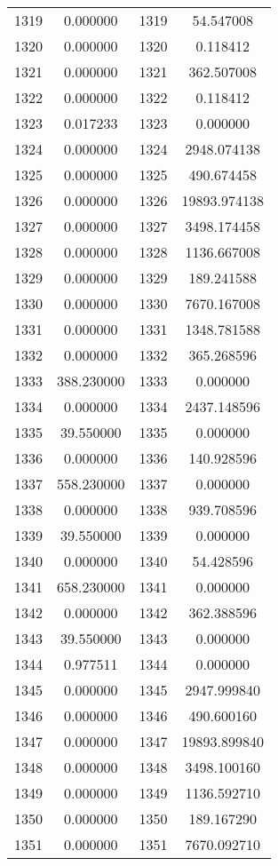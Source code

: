 \documentclass[12pt]{article}
\begin{document}
\begin{longtable}{@{}cccc@{}}
1319 & 0.000000 & 1319 & 54.547008 \\
1320 & 0.000000 & 1320 & 0.118412 \\
1321 & 0.000000 & 1321 & 362.507008 \\
1322 & 0.000000 & 1322 & 0.118412 \\
1323 & 0.017233 & 1323 & 0.000000 \\
1324 & 0.000000 & 1324 & 2948.074138 \\
1325 & 0.000000 & 1325 & 490.674458 \\
1326 & 0.000000 & 1326 & 19893.974138 \\
1327 & 0.000000 & 1327 & 3498.174458 \\
1328 & 0.000000 & 1328 & 1136.667008 \\
1329 & 0.000000 & 1329 & 189.241588 \\
1330 & 0.000000 & 1330 & 7670.167008 \\
1331 & 0.000000 & 1331 & 1348.781588 \\
1332 & 0.000000 & 1332 & 365.268596 \\
1333 & 388.230000 & 1333 & 0.000000 \\
1334 & 0.000000 & 1334 & 2437.148596 \\
1335 & 39.550000 & 1335 & 0.000000 \\
1336 & 0.000000 & 1336 & 140.928596 \\
1337 & 558.230000 & 1337 & 0.000000 \\
1338 & 0.000000 & 1338 & 939.708596 \\
1339 & 39.550000 & 1339 & 0.000000 \\
1340 & 0.000000 & 1340 & 54.428596 \\
1341 & 658.230000 & 1341 & 0.000000 \\
1342 & 0.000000 & 1342 & 362.388596 \\
1343 & 39.550000 & 1343 & 0.000000 \\
1344 & 0.977511 & 1344 & 0.000000 \\
1345 & 0.000000 & 1345 & 2947.999840 \\
1346 & 0.000000 & 1346 & 490.600160 \\
1347 & 0.000000 & 1347 & 19893.899840 \\
1348 & 0.000000 & 1348 & 3498.100160 \\
1349 & 0.000000 & 1349 & 1136.592710 \\
1350 & 0.000000 & 1350 & 189.167290 \\
1351 & 0.000000 & 1351 & 7670.092710 \\

\end{longtable}
\end{document}
